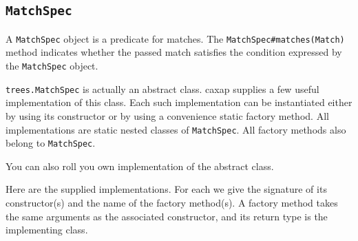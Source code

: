 \subsection{\texttt{MatchSpec}}
\label{matchspec_manual}

A \texttt{MatchSpec} object is a predicate for matches. The
\lstinline{MatchSpec#matches(Match)} method indicates whether the passed match
satisfies the condition expressed by the \texttt{MatchSpec} object.

\texttt{trees.MatchSpec} is actually an abstract class. caxap supplies a few
useful implementation of this class. Each such implementation can be
instantiated either by using its constructor or by using a convenience static
factory method. All implementations are static nested classes of
\texttt{MatchSpec}. All factory methods also belong to \texttt{MatchSpec}.

You can also roll you own implementation of the abstract class.

Here are the supplied implementations. For each we give the signature of its
constructor(s) and the name of the factory method(s). A factory method takes the
same arguments as the associated constructor, and its return type is the
implementing class.

